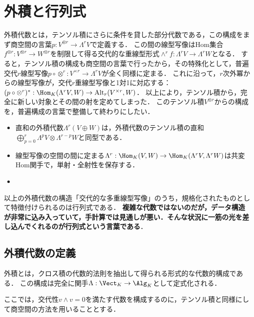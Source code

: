 \documentclass[uplatex, dvipdfmx]{jsreport}
\begin{document}
\section{外積と行列式}

\begin{tcolorbox}[colframe=ForestGreen, colback=ForestGreen!10!white, breakable,
    title=外積代数とその圏と，行列式という言葉]
    外積代数とは，テンソル積にさらに条件を貸した部分代数である，この構成をまず商空間の言葉$p:V^{\otimes r}\to\Lambda^rV$で定義する．
    この間の線型写像はHom集合$f^{\otimes r}:V^{\otimes r}\to W^{\otimes r}$を制限して得る交代的な重線型形式$\wedge^rf:\Lambda^rV\to\Lambda^rW$となる．
    すると，テンソル積の構成も商空間の言葉で行ったから，その特殊化として，普遍交代$r$線型写像$p\circ\otimes^r:V^{\times r}\to\Lambda^rV$が全く同様に定まる．
    これに沿って，$r$次外冪からの線型写像が，交代$r$重線型写像と1対1に対応する：$(p\circ\otimes^r)^*:\Hom_K(\Lambda^rV,W)\to\mathrm{Alt}_r(V^{\times r},W)$．
    以上により，テンソル積から，完全に新しい対象とその間の射を定めてしまった．
    このテンソル積$V^{\otimes r}$からの構成を，普遍構成の言葉で整備して終わりにしたい．
    \begin{itemize}
        \item 直和の外積代数$\Lambda^r(V\oplus W)$は，外積代数のテンソル積の直和$\bigoplus_{p=0}^r\Lambda^pV\otimes\Lambda^{r-p}W$と同型である．
        \item 線型写像の空間の間に定まる$\Lambda^r:\Hom_K(V,W)\to\Hom_K(\Lambda^rV,\Lambda^rW)$は共変Hom関手で，単射・全射性を保存する．
        \item 
    \end{itemize}
    以上の外積代数の構造「交代的な多重線型写像」のうち，規格化されたものとして特徴付けられるのは行列式である．
    \textbf{複雑な代数ではないのだが，データ構造が非常に込み入っていて，手計算では見通しが悪い．そんな状況に一筋の光を差し込んでくれるのが行列式という言葉である}．
\end{tcolorbox}

\subsection{外積代数の定義}

\begin{tcolorbox}[colframe=ForestGreen, colback=ForestGreen!10!white, breakable,
    title=外積]
    外積とは，クロス積の代数的法則を抽出して得られる形式的な代数的構成である．
    この構成は完全に関手$\Lambda:\Vect_K\to\Alg_K$として定式化される．

    ここでは，交代性$v\wedge v=0$を満たす代数を構成するのに，テンソル積と同様にして商空間の方法を用いることとする．
\end{tcolorbox}
\end{document}

